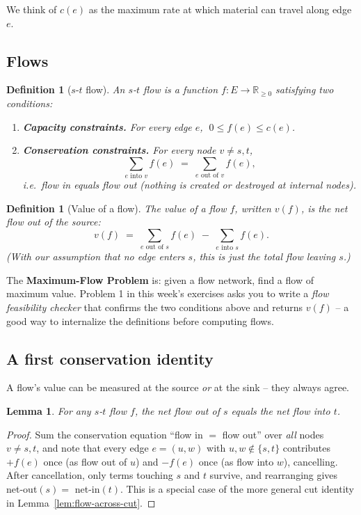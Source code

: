\documentclass[11pt]{article}
\newtheorem{lemma}[theorem]{Lemma}
\newtheorem{definition}[theorem]{Definition}
\begin{document}
We think of $c(e)$ as the maximum rate at which material can travel along edge $e$.

\subsection{Flows}

\begin{definition}[$s$-$t$ flow]
An \emph{$s$-$t$ flow} is a function $f : E \to \mathbb{R}_{\ge 0}$ satisfying two
conditions:
\begin{enumerate}[label=(\roman*)]
    \item \textbf{Capacity constraints.} For every edge $e$, $\;0 \le f(e) \le c(e)$.
    \item \textbf{Conservation constraints.} For every node $v \ne s, t$,
    \[
        \sum_{e \text{ into } v} f(e) \;=\; \sum_{e \text{ out of } v} f(e),
    \]
    i.e.\ flow in equals flow out (nothing is created or destroyed at internal nodes).
\end{enumerate}
\end{definition}

\begin{definition}[Value of a flow]
The \emph{value} of a flow $f$, written $v(f)$, is the net flow out of the source:
\[
    v(f) \;=\; \sum_{e \text{ out of } s} f(e) \;-\; \sum_{e \text{ into } s} f(e).
\]
(With our assumption that no edge enters $s$, this is just the total flow leaving $s$.)
\end{definition}

The \textbf{Maximum-Flow Problem} is: given a flow network, find a flow of maximum value.
Problem 1 in this week's exercises asks you to write a \emph{flow feasibility checker}
that confirms the two conditions above and returns $v(f)$ -- a good way to internalize the
definitions before computing flows.

\subsection{A first conservation identity}

A flow's value can be measured at the source \emph{or} at the sink -- they always agree.

\begin{lemma}
\label{lem:value-at-sink}
For any $s$-$t$ flow $f$, the net flow out of $s$ equals the net flow into $t$.
\end{lemma}

\begin{proof}
Sum the conservation equation ``flow in $=$ flow out'' over \emph{all} nodes $v \ne s, t$,
and note that every edge $e = (u,w)$ with $u, w \notin \{s,t\}$ contributes $+f(e)$ once
(as flow out of $u$) and $-f(e)$ once (as flow into $w$), cancelling. After cancellation,
only terms touching $s$ and $t$ survive, and rearranging gives net-out$(s)=$ net-in$(t)$.
This is a special case of the more general cut identity in
Lemma~\ref{lem:flow-across-cut}.
\end{proof}
\end{document}
